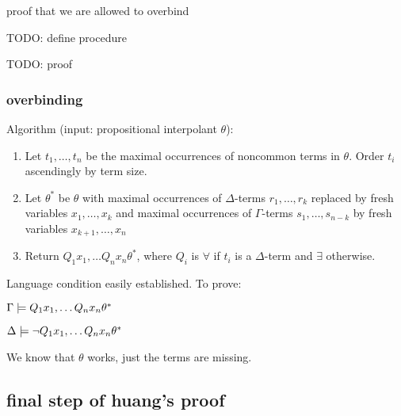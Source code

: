 \clearpage









	proof that we are allowed to overbind

	TODO: define procedure

	TODO: proof



	\subsubsection{overbinding}

	Algorithm (input: propositional interpolant $\theta$):
	\begin{enumerate}
		\item Let $t_1, \ldots, t_n$ be the maximal occurrences of noncommon terms in $\theta$. Order $t_i$ ascendingly by term size. 
		\item Let $\theta^*$ be $\theta$ with maximal occurrences of $\Delta$-terms $r_1, \ldots, r_k$ replaced by fresh variables $x_1, \ldots, x_k$ and maximal occurrences of $\Gamma$-terms $s_1, \ldots, s_{n-k}$ by fresh variables $x_{k+1}, \ldots, x_{n}$
		\item Return $Q_1 x_1, \ldots Q_n x_n \theta^*$, where $Q_i$ is $\forall$ if $t_i$ is a $\Delta$-term and $\exists$ otherwise.
	\end{enumerate}

	Language condition easily established. To prove:

	$\Gamma \models Q_1 x_1, \ldots Q_n x_n \theta^*$

	$\Delta \models \lnot Q_1 x_1, \ldots Q_n x_n \theta^*$

	We know that $\theta$ works, just the terms are missing.

\subsection{final step of huang's proof}

